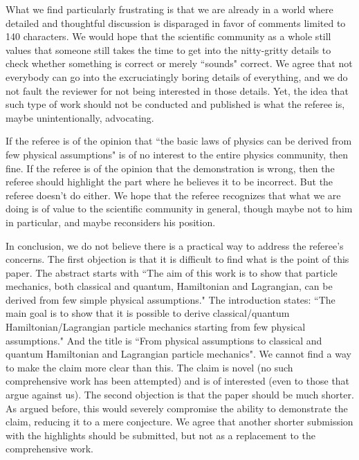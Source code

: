 \documentclass[10pt]{article}
\begin{document}
\begin{response}
What we find particularly frustrating is that we are already in a world where detailed and thoughtful discussion is disparaged in favor of comments limited to 140 characters. We would hope that the scientific community as a whole still values that someone still takes the time to get into the nitty-gritty details to check whether something is correct or merely ``sounds" correct. We agree that not everybody can go into the excruciatingly boring details of everything, and we do not fault the reviewer for not being interested in those details. Yet, the idea that such type of work should not be conducted and published is what the referee is, maybe unintentionally, advocating.

If the referee is of the opinion that ``the basic laws of physics can be derived from few physical assumptions" is of no interest to the entire physics community, then fine. If the referee is of the opinion that the demonstration is wrong, then the referee should highlight the part where he believes it to be incorrect. But the referee doesn't do either. We hope that the referee recognizes that what we are doing is of value to the scientific community in general, though maybe not to him in particular, and maybe reconsiders his position.

In conclusion, we do not believe there is a practical way to address the referee's concerns. The first objection is that it is difficult to find what is the point of this paper. The abstract starts with ``The aim of this work is to show that particle mechanics, both classical and quantum, Hamiltonian and Lagrangian, can be derived from few simple physical assumptions." The introduction states: ``The main goal is to show that it is possible to derive classical/quantum Hamiltonian/Lagrangian particle mechanics starting from few physical assumptions." And the title is ``From physical assumptions to classical and quantum Hamiltonian and Lagrangian particle mechanics". We cannot find a way to make the claim more clear than this. The claim is novel (no such comprehensive work has been attempted) and is of interested (even to those that argue against us). The second objection is that the paper should be much shorter. As argued before, this would severely compromise the ability to demonstrate the claim, reducing it to a mere conjecture. We agree that another shorter submission with the highlights should be submitted, but not as a replacement to the comprehensive work.

\end{response}
\end{document}
